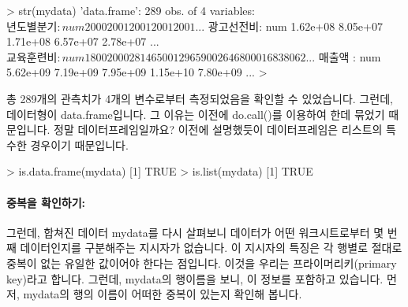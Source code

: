 \documentclass[tutorial.tex]{subfiles}
\begin{document}
\begin{Schunk}
\begin{Soutput}
> str(mydata)
'data.frame':	289 obs. of  4 variables:
 $ 년도별분기: num  2000 2001 2001 2001 2001 ...
 $ 광고선전비: num  1.62e+08 8.05e+07 1.71e+08 6.57e+07 2.78e+07 ...
 $ 교육훈련비: num  18002000 28146500 12965900 26468000 16838062 ...
 $ 매출액    : num  5.62e+09 7.19e+09 7.95e+09 1.15e+10 7.80e+09 ...
> 
\end{Soutput}
\end{Schunk}

총 289개의 관측치가 4개의 변수로부터 측정되었음을 확인할 수 있었습니다. 
그런데, 데이터형이 data.frame입니다.  
그 이유는 이전에  do.call()를 이용하여 한데 묶었기 때문입니다.
정말 데이터프레임일까요?  이전에 설명했듯이 데이터프레임은 리스트의 특수한 경우이기 때문입니다.

\begin{Schunk}
\begin{Soutput}
> is.data.frame(mydata)
[1] TRUE
> is.list(mydata)
[1] TRUE
\end{Soutput}
\end{Schunk}

\paragraph{중복을 확인하기:}
그런데, 합쳐진 데이터 mydata를 다시 살펴보니 데이터가 어떤 워크시트로부터 몇 번째 데이터인지를 구분해주는 지시자가 없습니다.
이 지시자의 특징은 각 행별로 절대로 중복이 없는 유일한 값이어야 한다는 점입니다.
이것을 우리는 프라이머리키(primary key)라고 합니다. 
그런데, mydata의 행이름을 보니, 이 정보를 포함하고 있습니다.
먼저, mydata의 행의 이름이 어떠한 중복이 있는지 확인해 봅니다.
\end{document}
